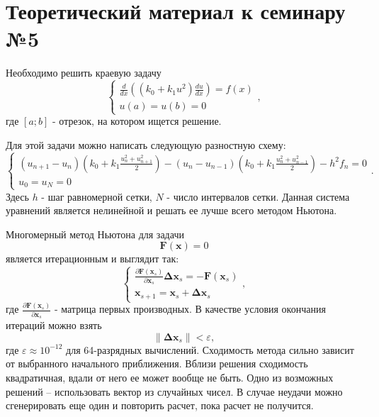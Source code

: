 \section{Теоретический материал к семинару №5}
Необходимо решить краевую задачу
\begin{equation} \label{c5eq1}
	\begin{cases}
		 \displaystyle \frac{d}{dx} \left( \left( k_0 + k_1 u^2 \right) \frac{du}{dx} \right) = f(x) \\
		u(a) = u(b) = 0
	\end{cases},
\end{equation}
где $[a; b]$ - отрезок, на котором ищется решение.

Для этой задачи можно написать следующую разностную схему:
\begin{equation} \label{c5eq2}
	\begin{cases}
		\displaystyle \left( u_{n+1} - u_n \right) \left( k_0 + k_1 \frac{u_n^2 + u_{n+1}^2}{2} \right) - \left( u_n - u_{n-1} \right) \left( k_0 + k_1 \frac{u_n^2 + u_{n-1}^2}{2} \right) - h^2 f_n = 0 \\
		u_0 = u_N = 0
	\end{cases}.
\end{equation}
Здесь $h$ - шаг равномерной сетки, $N$ - число интервалов сетки. Данная система уравнений является нелинейной и решать ее лучше всего методом Ньютона.

Многомерный метод Ньютона для задачи
\begin{equation} \label{c5eq3}
	\mathbf{F}(\mathbf{x}) = 0
\end{equation}
является итерационным и выглядит так:
\begin{equation} \label{c5eq4}
	\begin{cases}
		\displaystyle \frac{\partial \mathbf{F}(\mathbf{x}_s)}{\partial \mathbf{x}_s}  \mathbf{\Delta x}_s = -\mathbf{F}(\mathbf{x}_s)\\
		\mathbf{x}_{s+1} = \mathbf{x}_s + \mathbf{\Delta x}_s
	\end{cases},
\end{equation}
где $\displaystyle \frac{\partial \mathbf{F}(\mathbf{x}_s)}{\partial \mathbf{x}_s}$ - матрица первых производных. В качестве условия окончания итераций можно взять
\begin{equation} \label{c5eq5}
	\|\mathbf{\Delta x}_s\| < \varepsilon,
\end{equation}
где $\varepsilon \approx 10^{-12}$ для 64-разрядных вычислений. Сходимость метода сильно зависит от выбранного начального приближения. Вблизи решения сходимость квадратичная, вдали от него ее может вообще не быть. Одно из возможных решений – использовать вектор из случайных чисел. В случае неудачи можно сгенерировать еще один и повторить расчет, пока расчет не получится.
